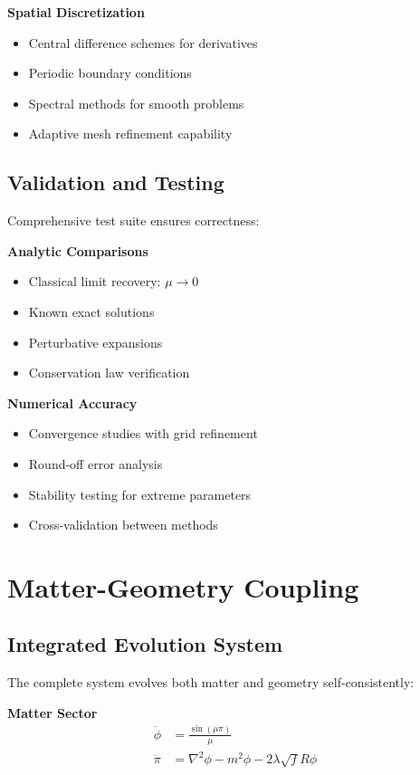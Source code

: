 \documentclass[11pt]{article}
\begin{document}
\textbf{Spatial Discretization}
\begin{itemize}
\item Central difference schemes for derivatives
\item Periodic boundary conditions
\item Spectral methods for smooth problems
\item Adaptive mesh refinement capability
\end{itemize}

\subsection{Validation and Testing}

Comprehensive test suite ensures correctness:

\textbf{Analytic Comparisons}
\begin{itemize}
\item Classical limit recovery: $\mu \to 0$
\item Known exact solutions
\item Perturbative expansions
\item Conservation law verification
\end{itemize}

\textbf{Numerical Accuracy}
\begin{itemize}
\item Convergence studies with grid refinement
\item Round-off error analysis
\item Stability testing for extreme parameters
\item Cross-validation between methods
\end{itemize}

\section{Matter-Geometry Coupling}

\subsection{Integrated Evolution System}

The complete system evolves both matter and geometry self-consistently:

\textbf{Matter Sector}
\begin{align}
\dot{\phi} &= \frac{\sin(\mu\pi)}{\mu} \\
\dot{\pi} &= \nabla^2\phi - m^2\phi - 2\lambda\sqrt{f}R\phi
\end{align}
\end{document}

